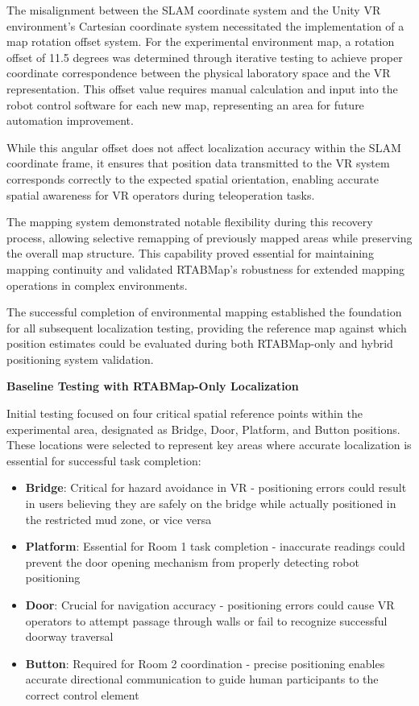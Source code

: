 The misalignment between the SLAM coordinate system and the Unity VR environment's Cartesian coordinate system necessitated the implementation of a map rotation offset system. For the experimental environment map, a rotation offset of 11.5 degrees was determined through iterative testing to achieve proper coordinate correspondence between the physical laboratory space and the VR representation. This offset value requires manual calculation and input into the robot control software for each new map, representing an area for future automation improvement.

While this angular offset does not affect localization accuracy within the SLAM coordinate frame, it ensures that position data transmitted to the VR system corresponds correctly to the expected spatial orientation, enabling accurate spatial awareness for VR operators during teleoperation tasks.

The mapping system demonstrated notable flexibility during this recovery process, allowing selective remapping of previously mapped areas while preserving the overall map structure. This capability proved essential for maintaining mapping continuity and validated RTABMap's robustness for extended mapping operations in complex environments.

The successful completion of environmental mapping established the foundation for all subsequent localization testing, providing the reference map against which position estimates could be evaluated during both RTABMap-only and hybrid positioning system validation.

\textbf{Baseline Testing with RTABMap-Only Localization}

Initial testing focused on four critical spatial reference points within the experimental area, designated as Bridge, Door, Platform, and Button positions. These locations were selected to represent key areas where accurate localization is essential for successful task completion:

\begin{itemize}
    \item \textbf{Bridge}: Critical for hazard avoidance in VR - positioning errors could result in users believing they are safely on the bridge while actually positioned in the restricted mud zone, or vice versa
    \item \textbf{Platform}: Essential for Room 1 task completion - inaccurate readings could prevent the door opening mechanism from properly detecting robot positioning
    \item \textbf{Door}: Crucial for navigation accuracy - positioning errors could cause VR operators to attempt passage through walls or fail to recognize successful doorway traversal
    \item \textbf{Button}: Required for Room 2 coordination - precise positioning enables accurate directional communication to guide human participants to the correct control element
\end{itemize}

